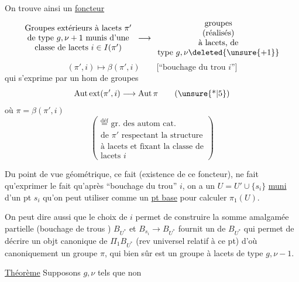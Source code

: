 On trouve ainsi un \uline{foncteur}
\[
\begin{array}{c}
\text{Groupes extérieurs à lacets }\pi'\\
\text{de type }g,\nu+1\text{ munis d'une}\\
\text{classe de lacets }i\in I(\pi')
\end{array}
\longrightarrow
\begin{array}{c}
\text{groupes}\\
\text{(réalisés)}\\
\text{à lacets, de}\\
\text{type }g,\nu\deleted{\unsure{+1}}
\end{array}
\]
\[
(\pi',i)\longmapsto\beta(\pi',i)
\qquad
\text{[``bouchage du trou \(i\)'']}
\]
qui s'exprime par un hom de groupes
\[
\operatorname{Aut\,ext}(\pi',i)\longrightarrow\operatorname{Aut}\pi
\tag{\unsure{*|5}}
\]
où \(\pi=\beta(\pi',i)\)
\[
\left(
\begin{array}{l}
\overset{\text{déf}}{=}\text{ gr. des autom cat.}\\
\text{de }\pi'\text{ respectant la structure}\\
\text{à lacets et fixant la classe de}\\
\text{lacets }i
\end{array}
\right)
\]


Du point de vue géométrique, ce fait (existence de ce foncteur), ne fait qu'exprimer le fait qu'après ``bouchage du trou'' \(i\), on a un  \(U=U'\cup\{s_i\}\) \uline{muni} d'un pt \(s_i\) qu'on peut utiliser comme un \uline{pt base}  pour calculer \(\pi_1(U)\).

On peut dire aussi que le choix de \(i\) permet de construire la somme amalgamée partielle (bouchage de trous ) \(B_{U^*}\)
et \(B_{s_i}\longrightarrow B_{U^*}\) fournit un  de \(B_{U^*}\) qui permet de décrire un objt canonique de \(\Pi_1B_{U^*}\) (rev universel relatif à ce pt) d'où canoniquement un groupe \(\pi\), qui bien sûr est un groupe à lacets de type \(g,\nu-1\).

\uline{Théorème} Supposons \(g,\nu\) tels que non

